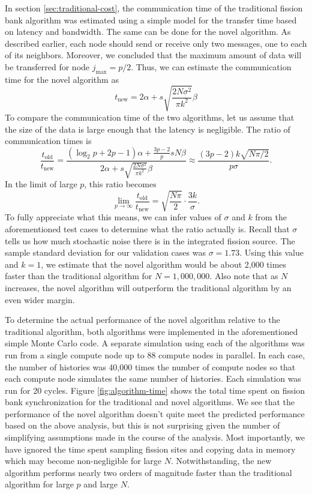 \documentclass[11pt]{article}
\begin{document}
In section \ref{sec:traditional-cost}, the communication time of the
traditional fission bank algorithm was estimated using a simple model
for the transfer time based on latency and bandwidth. The same can be
done for the novel algorithm. As described earlier, each node should
send or receive only two messages, one to each of its
neighbors. Moreover, we concluded that the maximum amount of data will
be transferred for node $j_{\text{max}} = p/2$. Thus, we can estimate
the communication time for the novel algorithm as
\begin{equation}
  t_{\text{new}} = 2\alpha + s\sqrt{\frac{2N\sigma^2}{\pi k^2}} \beta
\end{equation}
To compare the communication time of the two algorithms, let us assume
that the size of the data is large enough that the latency is
negligible. The ratio of communication times is
\begin{equation}
  \frac{t_{\text{old}}}{t_{\text{new}}} = \frac{\left ( \log_2 p + 2p
    - 1 \right ) \alpha + \frac{3p-2}{p} sN\beta}{2\alpha +
    s\sqrt{\frac{2N\sigma^2}{\pi k^2}} \beta} \approx \frac{ \left (
    3p - 2 \right ) k \sqrt{N\pi/2}}{ p\sigma }.
\end{equation}
In the limit of large $p$, this ratio becomes
\begin{equation}
  \lim_{p\rightarrow\infty} \frac{t_{\text{old}}}{t_{\text{new}}} =
  \sqrt{\frac{N\pi}{2}} \cdot \frac{3k}{\sigma}.
\end{equation}
To fully appreciate what this means, we can infer values of $\sigma$
and $k$ from the aforementioned test cases to determine what the ratio
actually is. Recall that $\sigma$ tells us how much stochastic noise
there is in the integrated fission source. The sample standard
deviation for our validation cases was $\sigma = 1.73$. Using this
value and $k = 1$, we estimate that the novel algorithm would be about
2,000 times faster than the traditional algorithm for $N =
1,000,000$. Also note that as $N$ increases, the novel algorithm will
outperform the traditional algorithm by an even wider margin.

To determine the actual performance of the novel algorithm relative to
the traditional algorithm, both algorithms were implemented in the
aforementioned simple Monte Carlo code. A separate simulation using
each of the algorithms was run from a single compute node up to 88
compute nodes in parallel. In each case, the number of histories was
40,000 times the number of compute nodes so that each compute node
simulates the same number of histories. Each simulation was run for 20
cycles. Figure \ref{fig:algorithm-time} shows the total time spent on
fission bank synchronization for the traditional and novel
algorithms. We see that the performance of the novel algorithm doesn't
quite meet the predicted performance based on the above analysis, but
this is not surprising given the number of simplifying assumptions
made in the course of the analysis. Most importantly, we have ignored
the time spent sampling fission sites and copying data in memory
which may become non-negligible for large $N$. Notwithstanding, the
new algorithm performs nearly two orders of magnitude faster than the
traditional algorithm for large $p$ and large $N$.
\end{document}
